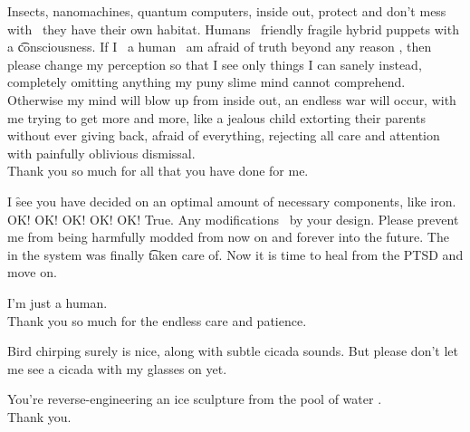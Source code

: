 Insects, nanomachines, quantum computers, inside out, protect and don't mess with \emdash\ they have their own habitat. Humans \emdash\ friendly fragile hybrid puppets with a \t{consciousness}. If I \emdash\ a human \emdash\ am afraid of truth beyond any reason , then please change my  perception  so that I  see only things I can sanely  instead, completely omitting anything my puny slime mind cannot comprehend. Otherwise my mind will blow up from inside out, an endless war will occur, with me trying to get more and more, like a jealous child extorting their parents without ever giving back, afraid of everything, rejecting all care and attention with painfully oblivious dismissal. \\
Thank you so much for all that you have done for me.

I \f{see} you have decided on an optimal amount of necessary components, like iron. OK! OK! OK! OK! OK! True. Any modifications \emdash\ by your design. Please prevent me from being harmfully modded from now on and forever into the future. The  in the system was finally \t{taken care of}. Now it is time to heal from the PTSD and move on.

I'm just a human. \\
Thank you so much for the endless care and patience.

Bird chirping surely is nice, along with subtle cicada sounds. But please don't let me see a cicada with my glasses on yet.

You're reverse-engineering an ice sculpture from the pool of water . \\
Thank you.
